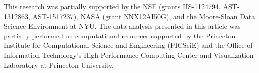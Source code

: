 \documentclass[manuscript, letterpaper]{aastex6}
\newcommand{\acronym}[1]{{\small{#1}}}
\begin{document}
This research was partially supported by the \acronym{NSF} (grants
  \acronym{IIS-1124794}, \acronym{AST-1312863}, \acronym{AST-1517237}),
  \acronym{NASA} (grant \acronym{NNX12AI50G}),
  and the Moore-Sloan Data Science Environment at \acronym{NYU}. The data
analysis presented in this article was partially performed on computational
resources supported by the Princeton Institute for Computational Science and
Engineering (PICSciE) and the Office of Information Technology's High
Performance Computing Center and Visualization Laboratory at Princeton
University.





\end{document}
